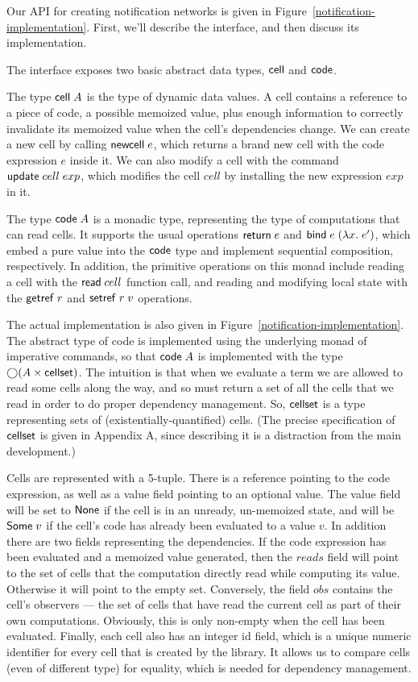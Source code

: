 Our API for creating notification networks is given in
Figure~\ref{notification-implementation}. First, we'll describe
the interface, and then discuss its implementation. 

The interface exposes two basic abstract data types, $\mathsf{cell}$
and $\mathsf{code}$.

The type $\mathsf{cell}\;{A}$ is the type of dynamic data values. A cell
contains a reference to a piece of code, a possible memoized value,
plus enough information to correctly invalidate its memoized value
when the cell's dependencies change. We can create a new cell by
calling $\mathsf{newcell}\; e$, which returns a brand new cell with the
code expression $e$ inside it. We can also modify a cell with 
the command $\mathsf{update}\;cell\;exp$, which modifies the cell
$cell$ by installing the new expression $exp$ in it. 

The type $\mathsf{code}\;{A}$ is a monadic type, representing the type of
computations that can read cells. It supports the usual operations
$\mathsf{return}\; e$ and $\mathsf{bind}\; e\; (\lambda x.\;e')$, which embed a pure value
into the $\mathsf{code}$ type and implement sequential composition,
respectively. In addition, the primitive operations on this monad 
include reading a cell with the $\mathsf{read}\; cell$ function call, and 
reading and modifying local state with the $\mathsf{getref}\; r$ and $\mathsf{setref}\; r\;v$
operations. 
 
The actual implementation is also given in
Figure~\ref{notification-implementation}. The abstract type of code is
implemented using the underlying monad of imperative commands, so that
$\mathsf{code}\;{A}$ is implemented with the type $\bigcirc{(A \times
  \mathsf{cellset})}$.  The intuition is that when we evaluate a term we are
allowed to read some cells along the way, and so must return a set of
all the cells that we read in order to do proper dependency
management. So, $\mathsf{cellset}$ is a type representing sets of
(existentially-quantified) cells.  (The precise specification of
$\mathsf{cellset}$ is given in Appendix A, since describing it is a
distraction from the main development.)

Cells are represented with a 5-tuple. There is a reference pointing to
the code expression, as well as a value field pointing to an optional
value. The value field will be set to $\mathsf{None}$ if the cell is in
an unready, un-memoized state, and will be $\mathsf{Some}\;v$ if the
cell's code has already been evaluated to a value $v$. In addition there are
two fields representing the dependencies. If the code expression has
been evaluated and a memoized value generated, then the $reads$ field
will point to the set of cells that the computation directly read
while computing its value. Otherwise it will point to the empty
set. Conversely, the field $obs$ contains the cell's observers --- the
set of cells that have read the current cell as part of their own
computations. Obviously, this is only non-empty when the cell has been
evaluated. Finally, each cell also has an integer id field, which is a
unique numeric identifier for every cell that is created by the
library. It allows us to compare cells (even of different type) for
equality, which is needed for dependency management.


